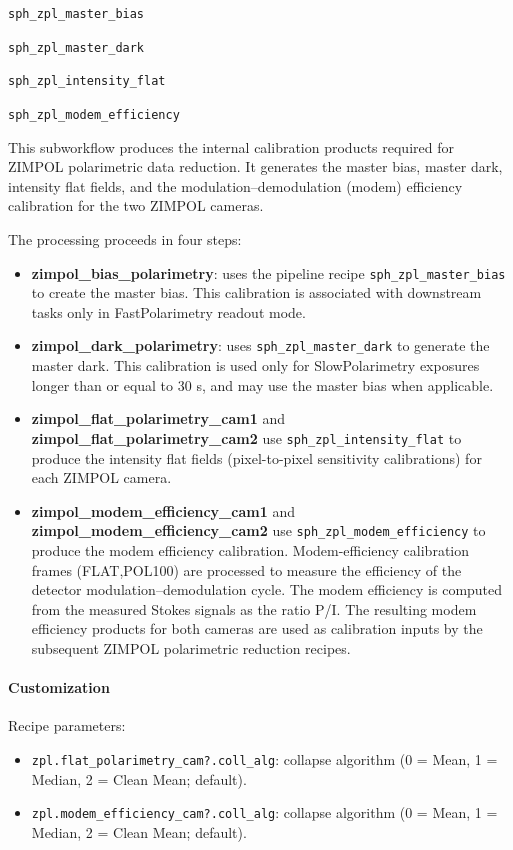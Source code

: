 \texttt{sph\_zpl\_master\_bias}

\texttt{sph\_zpl\_master\_dark}

\texttt{sph\_zpl\_intensity\_flat}

\texttt{sph\_zpl\_modem\_efficiency}

This subworkflow produces the internal calibration products required for ZIMPOL polarimetric data reduction.
It generates the master bias, master dark, intensity flat fields,
and the modulation--demodulation (modem) efficiency calibration for the two ZIMPOL cameras.

The processing proceeds in four steps:

\begin{itemize}
\item \textbf{zimpol\_bias\_polarimetry}: uses the pipeline recipe \texttt{sph\_zpl\_master\_bias} to create the master bias.
This calibration is associated with downstream tasks only in FastPolarimetry readout mode.

\item \textbf{zimpol\_dark\_polarimetry}: uses \texttt{sph\_zpl\_master\_dark} to generate the master dark.
This calibration is used only for SlowPolarimetry exposures longer than or equal to 30 s,
and may use the master bias when applicable.

\item \textbf{zimpol\_flat\_polarimetry\_cam1} and \textbf{zimpol\_flat\_polarimetry\_cam2} use \texttt{sph\_zpl\_intensity\_flat} to
produce the intensity flat fields (pixel-to-pixel sensitivity calibrations) for each ZIMPOL camera.

\item \textbf{zimpol\_modem\_efficiency\_cam1} and \textbf{zimpol\_modem\_efficiency\_cam2} use \texttt{sph\_zpl\_modem\_efficiency} to
produce the modem efficiency calibration.
Modem-efficiency calibration frames (FLAT,POL100) are processed to measure the efficiency of the detector modulation--demodulation cycle.
The modem efficiency is computed from the measured Stokes signals as the ratio P/I.
The resulting modem efficiency products for both cameras are used as calibration inputs by the subsequent ZIMPOL polarimetric reduction recipes.
\end{itemize}

\paragraph{Customization}

Recipe parameters:
\begin{itemize}
\item \texttt{zpl.flat\_polarimetry\_cam?.coll\_alg}: collapse algorithm
(0 = Mean, 1 = Median, 2 = Clean Mean; default).
\item \texttt{zpl.modem\_efficiency\_cam?.coll\_alg}: collapse algorithm
(0 = Mean, 1 = Median, 2 = Clean Mean; default).
\end{itemize}


